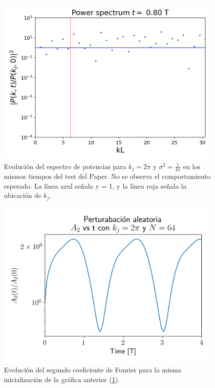 \documentclass[notitlepage,letterpaper,12pt]{article} %
\begin{document}
\begin{figure}[H]
   \includegraphics[scale= 0.5]{1powerSeries32.png}
  \caption{Evolución del espectro de potencias para $k_j = 2\pi$  y $\sigma^2 = \frac{1}{4\pi}$ en los mismos tiempos del test del Paper. No se observa el comportamiento esperado. La línea azul señala y = 1, y la línea roja señala la ubicación de $k_j$.}
  \label{fig: potencias1}
\end{figure}

\begin{figure}[H]
  \centering
   \includegraphics[scale= 0.6]{1Jeans2Coef.png}
  \caption{Evolución del segundo coeficiente de Fourier para la misma inicialización de la gráfica anterior (\ref{fig: potencias1}).}
  \label{fig: coef1}
\end{figure}
\end{document}
